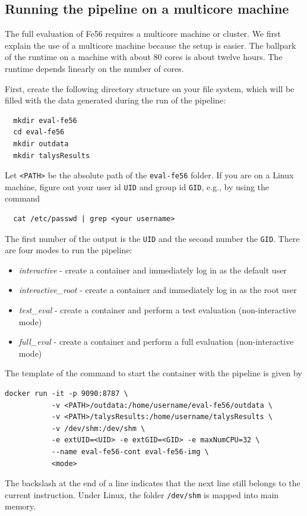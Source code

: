 \documentclass[12pt,a4paper]{scrartcl}
\begin{document}
\subsection{Running the pipeline on a multicore machine}

The full evaluation of Fe56 requires a multicore machine or cluster.
We first explain the use of a multicore machine because the setup is easier.
The ballpark of the runtime on a machine with about 80 cores is about twelve hours.
The runtime depends linearly on the number of cores.

First, create the following directory structure on your file system,
which will be filled with the data generated during the run of the pipeline:
\begin{verbatim}
  mkdir eval-fe56
  cd eval-fe56
  mkdir outdata
  mkdir talysResults
\end{verbatim}

Let \verb#<PATH># be the absolute path of the \verb#eval-fe56# folder.
If you are on a Linux machine, figure out your user id \verb#UID# and group id \verb#GID#,
e.g., by using the command
\begin{verbatim}
  cat /etc/passwd | grep <your username>
\end{verbatim}
The first number of the output is the \verb#UID# and the second number the \verb#GID#. 
There are four modes to run the pipeline:
\begin{itemize}
  \item \emph{interactive} - create a container and immediately log in as the default user
  \item \emph{interactive\_root} - create a container and immediately log in as the root user
  \item \emph{test\_eval} - create a container and perform a test evaluation (non-interactive mode)
  \item \emph{full\_eval} - create a container and perform a full evaluation (non-interactive mode)
\end{itemize}
The template of the command to start the container with the pipeline is given by
\begin{verbatim}
docker run -it -p 9090:8787 \
           -v <PATH>/outdata:/home/username/eval-fe56/outdata \
           -v <PATH>/talysResults:/home/username/talysResults \
           -v /dev/shm:/dev/shm \
           -e extUID=<UID> -e extGID=<GID> -e maxNumCPU=32 \
           --name eval-fe56-cont eval-fe56-img \
           <mode> 
\end{verbatim}
The backslash at the end of a line indicates that the next line still belongs
to the current instruction.
Under Linux, the folder \verb#/dev/shm# is mapped into main memory.
\end{document}
